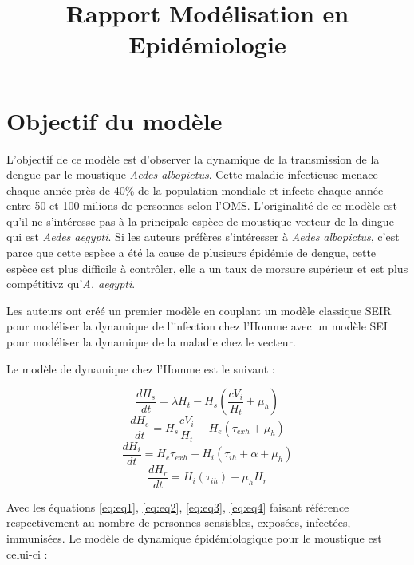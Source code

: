 \documentclass[
  12pt,
  oneside]{article}
\title{Rapport Modélisation en Epidémiologie}
\date{}
\begin{document}
\maketitle

\hypertarget{objectif-du-moduxe8le}{%
\section{Objectif du modèle}\label{objectif-du-moduxe8le}}

L'objectif de ce modèle est d'observer la dynamique de la transmission
de la dengue par le moustique \emph{Aedes albopictus}. Cette maladie
infectieuse menace chaque année près de 40\% de la population mondiale
et infecte chaque année entre 50 et 100 milions de personnes selon
l'OMS. L'originalité de ce modèle est qu'il ne s'intéresse pas à la
principale espèce de moustique vecteur de la dingue qui est \emph{Aedes
aegypti}. Si les auteurs préfères s'intéresser à \emph{Aedes
albopictus}, c'est parce que cette espèce a été la cause de plusieurs
épidémie de dengue, cette espèce est plus difficile à contrôler, elle a
un taux de morsure supérieur et est plus compétitivz qu'\emph{A.
aegypti}.

Les auteurs ont créé un premier modèle en couplant un modèle classique
SEIR pour modéliser la dynamique de l'infection chez l'Homme avec un
modèle SEI pour modéliser la dynamique de la maladie chez le vecteur.

Le modèle de dynamique chez l'Homme est le suivant :

\begin{equation} \frac{dH_s}{dt} = \lambda H_t - H_s \left(\frac{cV_i}{H_t} + \mu_h\right)\label{eq:eq1}\end{equation}
\begin{equation} \frac{dH_e}{dt} = H_s \frac{cV_i}{H_t} - H_e (\tau_{exh} + \mu_h)\label{eq:eq2}\end{equation}
\begin{equation} \frac{dH_i}{dt} = H_e\tau_{exh} - H_i\left(\tau_{ih} + \alpha + \mu_h\right)\label{eq:eq3}\end{equation}
\begin{equation} \frac{dH_r}{dt} = H_i\left(\tau_{ih}\right) - \mu_h H_r\label{eq:eq4}\end{equation}

Avec les équations \ref{eq:eq1}, \ref{eq:eq2}, \ref{eq:eq3},
\ref{eq:eq4} faisant référence respectivement au nombre de personnes
sensisbles, exposées, infectées, immunisées. Le modèle de dynamique
épidémiologique pour le moustique est celui-ci :
\end{document}
